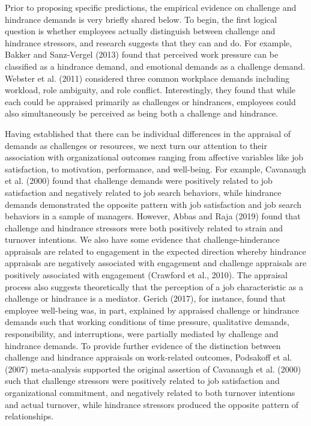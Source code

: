 \documentclass[
  man]{apa6}
\begin{document}
Prior to proposing specific predictions, the empirical evidence on challenge and hindrance demands is very briefly shared below. To begin, the first logical question is whether employees actually distinguish between challenge and hindrance stressors, and research suggests that they can and do. For example, Bakker and Sanz-Vergel (2013) found that perceived work pressure can be classified as a hindrance demand, and emotional demands as a challenge demand. Webster et al. (2011) considered three common workplace demands including workload, role ambiguity, and role conflict. Interestingly, they found that while each could be appraised primarily as challenges or hindrances, employees could also simultaneously be perceived as being both a challenge and hindrance.

Having established that there can be individual differences in the appraisal of demands as challenges or resources, we next turn our attention to their association with organizational outcomes ranging from affective variables like job satisfaction, to motivation, performance, and well-being. For example, Cavanaugh et al. (2000) found that challenge demands were positively related to job satisfaction and negatively related to job search behaviors, while hindrance demands demonstrated the opposite pattern with job satisfaction and job search behaviors in a sample of managers. However, Abbas and Raja (2019) found that challenge and hindrance stressors were both positively related to strain and turnover intentions. We also have some evidence that challenge-hinderance appraisals are related to engagement in the expected direction whereby hindrance appraisals are negatively associated with engagement and challenge appraisals are positively associated with engagement (Crawford et al., 2010). The appraisal process also suggests theoretically that the perception of a job characteristic as a challenge or hindrance is a mediator. Gerich (2017), for instance, found that employee well-being was, in part, explained by appraised challenge or hindrance demands such that working conditions of time pressure, qualitative demands, responsibility, and interruptions, were partially mediated by challenge and hindrance demands. To provide further evidence of the distinction between challenge and hindrance appraisals on work-related outcomes, Podsakoff et al. (2007) meta-analysis supported the original assertion of Cavanaugh et al. (2000) such that challenge stressors were positively related to job satisfaction and organizational commitment, and negatively related to both turnover intentions and actual turnover, while hindrance stressors produced the opposite pattern of relationships.
\end{document}
